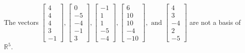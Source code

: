 \begin{exercise}
\begin{exerciseStatement}
  \end{exerciseStatement}
  \begin{exerciseAnswer}
   The vectors \(\left[\begin{array}{r}
4 \\
4 \\
4 \\
3 \\
-1
\end{array}\right] , \left[\begin{array}{r}
0 \\
-5 \\
-4 \\
-1 \\
3
\end{array}\right] , \left[\begin{array}{r}
-1 \\
1 \\
1 \\
-5 \\
-4
\end{array}\right] , \left[\begin{array}{r}
6 \\
10 \\
10 \\
-4 \\
-10
\end{array}\right] , \text{ and } \left[\begin{array}{r}
4 \\
3 \\
-4 \\
2 \\
-5
\end{array}\right]\) 
  	 are not  a basis of \(\mathbb{R}^5\).
  


  \end{exerciseAnswer}
\end{exercise}